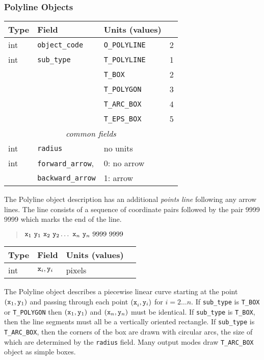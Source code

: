 \subsubsection{Polyline Objects}
%
\begin{center}
\begin{tabular} {|l|l|ll|}
\hline
Type	& Field			& Units (values)	&	\\ \hline
\hline
%
int	& {\tt object\_code}	& {\tt O\_POLYLINE}	& 2	 \\ \hline
%
int	& {\tt sub\_type}	& {\tt T\_POLYLINE}	& 1	\\
	&			& {\tt T\_BOX}		& 2	\\
	&			& {\tt T\_POLYGON}	& 3	\\
	&                       & {\tt T\_ARC\_BOX}	& 4	\\
	&                       & {\tt T\_EPS\_BOX}	& 5	\\ \hline
%
\multicolumn{4}{c}{\it common fields}				\\ \hline
%
int	& {\tt radius}		& no units		&	\\
int	& {\tt forward\_arrow},	& 0: no arrow		&	\\
	& {\tt backward\_arrow}	& 1: arrow		&	\\ \hline
\end{tabular}
\end{center}
%
The Polyline object description has an additional {\em points line} following
	any arrow lines.
The line consists of a sequence of coordinate pairs followed by the
	pair 9999 9999 which marks the end of the line.
%
\begin{quote}
$
	 {\tt x}_1 ~{\tt y}_1 ~{\tt x}_2 ~{\tt y}_2 \ldots
	~{\tt x}_n ~{\tt y}_n ~9999 ~9999
$
\end{quote}
%
\begin{center}
\begin{tabular} {|l|l|ll|}
\hline
Type	& Field			& Units (values)	&	\\ \hline
\hline
%
int	& ${\tt x}_i, {\tt y}_i$& pixels		&	\\ \hline
\end{tabular}
\end{center}

The Polyline object describes a piecewise linear curve starting at
	the point $({\tt x}_1, {\tt y}_1)$ and passing through
	each point ${(\tt x}_i, {\tt y}_i)$ for $i = 2 \ldots n$.
If {\tt sub\_type} is {\tt T\_BOX} or {\tt T\_POLYGON} then
	$({\tt x}_1, {\tt y}_1)$ and $({\tt x}_n, {\tt y}_n)$ must
	be identical.
If {\tt sub\_type} is {\tt T\_BOX}, then the line segments must all be
	a vertically oriented rectangle.
If {\tt sub\_type} is {\tt T\_ARC\_BOX}, then the corners of the box are
	drawn with circular arcs, the size of which are determined by
	the {\tt radius} field.
Many output modes draw {\tt T\_ARC\_BOX} object as simple boxes.

